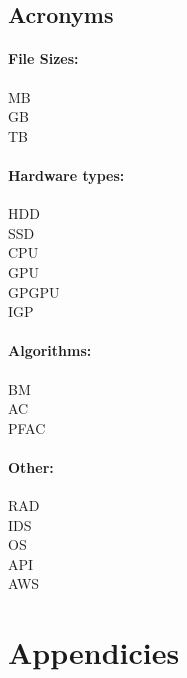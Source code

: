 \documentclass[12pt]{dissertation}
\begin{document}
\begin{multicols}{2}
{\small
\section*{Acronyms}
\subsubsection*{File Sizes:}
\acf{MB}\\
\acf{GB}\\
\acf{TB}
\subsubsection*{Hardware types:}
\acf{HDD}\\
\acf{SSD}\\
\acf{CPU}\\
\acf{GPU}\\
\acf{GPGPU}\\
\acf{IGP}
\columnbreak
\subsubsection*{Algorithms:}
\acf{BM}\\
\acf{AC}\\
\acf{PFAC}
\subsubsection*{Other:}
\acf{RAD}\\
\acf{IDS}\\
\acf{OS}\\
\acf{API}\\
\acf{AWS}
\par}
\end{multicols}

\chapter{Appendicies}
\renewcommand{\thesection}{\Alph{section}}
\newpage


%
\end{document}
